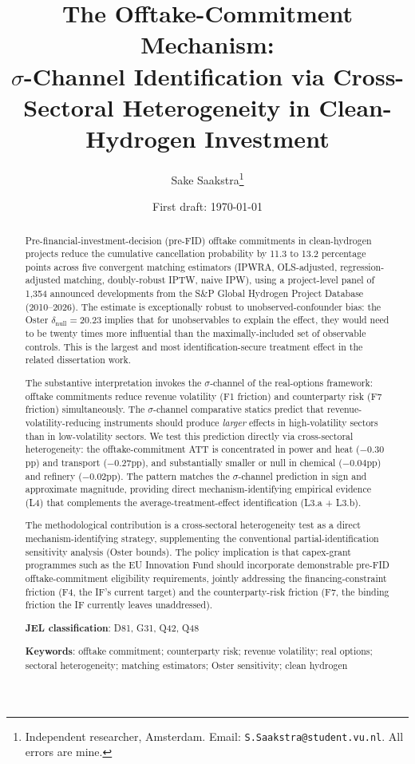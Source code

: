 \documentclass[12pt,a4paper]{article}
\title{The Offtake-Commitment Mechanism: \\ $\sigma$-Channel Identification via Cross-Sectoral Heterogeneity in Clean-Hydrogen Investment}
\author{Sake Saakstra\thanks{Independent researcher, Amsterdam. Email: \texttt{S.Saakstra@student.vu.nl}. All errors are mine.}}
\date{First draft: \today}
\theoremstyle{plain}
\theoremstyle{definition}
\begin{document}
\maketitle

\begin{abstract}
\noindent
Pre-financial-investment-decision (pre-FID) offtake commitments in clean-hydrogen projects reduce the cumulative cancellation probability by 11.3 to 13.2 percentage points across five convergent matching estimators (IPWRA, OLS-adjusted, regression-adjusted matching, doubly-robust IPTW, naive IPW), using a project-level panel of 1{,}354 announced developments from the S\&P Global Hydrogen Project Database (2010--2026). The estimate is exceptionally robust to unobserved-confounder bias: the Oster $\delta_{\text{null}} = 20.23$ implies that for unobservables to explain the effect, they would need to be twenty times more influential than the maximally-included set of observable controls. This is the largest and most identification-secure treatment effect in the related dissertation work.

The substantive interpretation invokes the $\sigma$-channel of the real-options framework: offtake commitments reduce revenue volatility (F1 friction) and counterparty risk (F7 friction) simultaneously. The $\sigma$-channel comparative statics predict that revenue-volatility-reducing instruments should produce \emph{larger} effects in high-volatility sectors than in low-volatility sectors. We test this prediction directly via cross-sectoral heterogeneity: the offtake-commitment ATT is concentrated in power and heat ($-0.30$pp) and transport ($-0.27$pp), and substantially smaller or null in chemical ($-0.04$pp) and refinery ($-0.02$pp). The pattern matches the $\sigma$-channel prediction in sign and approximate magnitude, providing direct mechanism-identifying empirical evidence (L4) that complements the average-treatment-effect identification (L3.a + L3.b).

The methodological contribution is a cross-sectoral heterogeneity test as a direct mechanism-identifying strategy, supplementing the conventional partial-identification sensitivity analysis (Oster bounds). The policy implication is that capex-grant programmes such as the EU Innovation Fund should incorporate demonstrable pre-FID offtake-commitment eligibility requirements, jointly addressing the financing-constraint friction (F4, the IF's current target) and the counterparty-risk friction (F7, the binding friction the IF currently leaves unaddressed).

\medskip
\noindent\textbf{JEL classification}: D81, G31, Q42, Q48

\noindent\textbf{Keywords}: offtake commitment; counterparty risk; revenue volatility; real options; sectoral heterogeneity; matching estimators; Oster sensitivity; clean hydrogen
\end{abstract}
\end{document}
